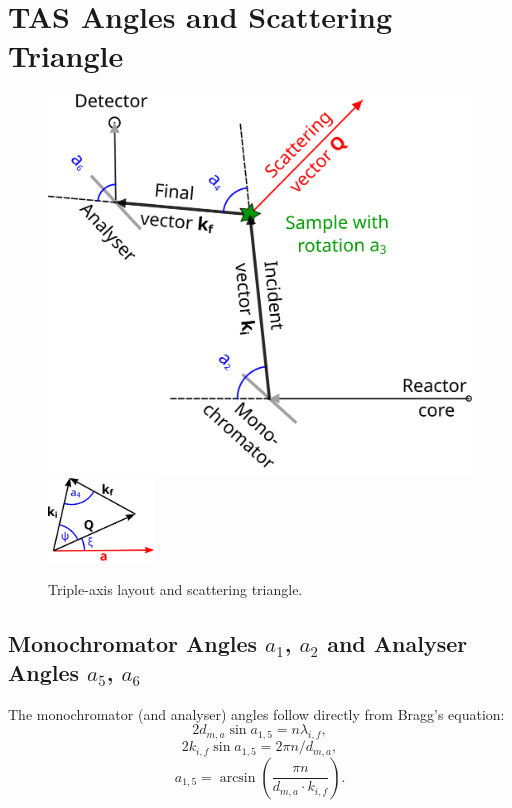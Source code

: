 



\section{TAS Angles and Scattering Triangle}
\begin{figure}
\begin{center}
	\includegraphics[width = 0.5 \textwidth]{figures/tas}
	\hspace{1.5cm}
	\includegraphics[trim=0 -2cm 0 0, width=0.25\textwidth]{figures/triangle}
\end{center}
\caption{Triple-axis layout and scattering triangle.}
\end{figure}

\subsection*{Monochromator Angles $a_1$, $a_2$ and Analyser Angles $a_5$, $a_6$}

The monochromator (and analyser) angles follow directly from Bragg's equation:
\begin{equation} 2 d_{m,a}\sin a_{1,5} = n \lambda_{i,f}, \end{equation}
\begin{equation} 2 k_{i,f} \sin a_{1,5} = 2 \pi n / d_{m,a}, \end{equation}
\begin{equation} \boxed{ a_{1,5} = \arcsin \left( \frac{\pi n}{d_{m,a} \cdot k_{i,f}} \right). } \end{equation}

